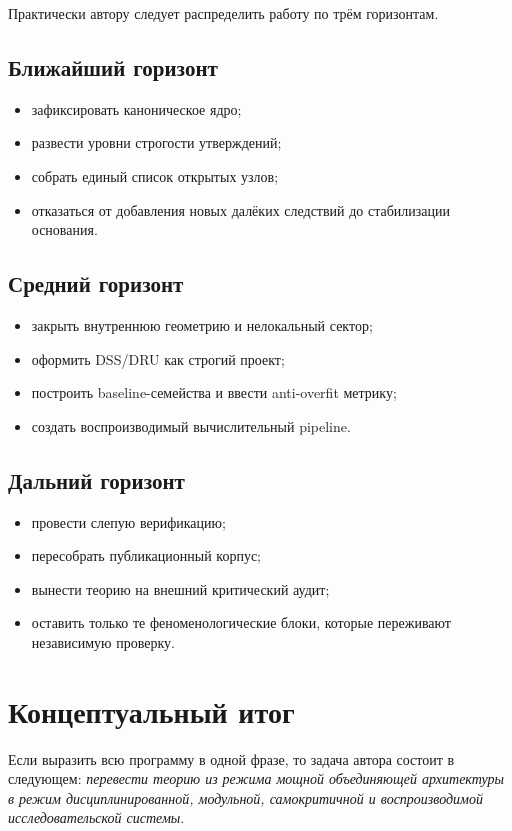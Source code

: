 \documentclass[12pt,a4paper]{article}
\begin{document}
Практически автору следует распределить работу по трём горизонтам.

\subsection{Ближайший горизонт}
\begin{itemize}
    \item зафиксировать каноническое ядро;
    \item развести уровни строгости утверждений;
    \item собрать единый список открытых узлов;
    \item отказаться от добавления новых далёких следствий до стабилизации основания.
\end{itemize}

\subsection{Средний горизонт}
\begin{itemize}
    \item закрыть внутреннюю геометрию и нелокальный сектор;
    \item оформить DSS/DRU как строгий проект;
    \item построить baseline-семейства и ввести anti-overfit метрику;
    \item создать воспроизводимый вычислительный pipeline.
\end{itemize}

\subsection{Дальний горизонт}
\begin{itemize}
    \item провести слепую верификацию;
    \item пересобрать публикационный корпус;
    \item вынести теорию на внешний критический аудит;
    \item оставить только те феноменологические блоки, которые переживают независимую проверку.
\end{itemize}

\section{Концептуальный итог}

Если выразить всю программу в одной фразе, то задача автора состоит в следующем: \emph{перевести теорию из режима мощной объединяющей архитектуры в режим дисциплинированной, модульной, самокритичной и воспроизводимой исследовательской системы}.
\end{document}
